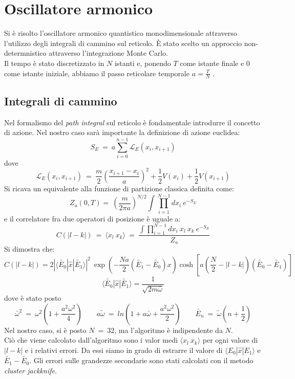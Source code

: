 \chapter{Oscillatore armonico}
Si è risolto l'oscillatore armonico quantistico monodimensionale attraverso l'utilizzo degli integrali di cammino sul reticolo.
È stato scelto un approccio non-determnistico attraverso l'integrazione Monte Carlo.\\
Il tempo è stato discretizzato in $N$ istanti e, ponendo $T$ come istante finale e $0$ come istante iniziale,
abbiamo il passo reticolare temporale $ a = \frac{T}{N}$ .
\section{Integrali di cammino}
Nel formalismo del \emph{path integral} sul reticolo è fondamentale introdurre il concetto di azione.
Nel nostro caso sarà importante la definizione di azione euclidea:
$$
 S_E  \ = \ a \sum_{i=0}^{n-1} \mathcal{L}_E(x_i,x_{i+1})
$$
dove
$$
\mathcal{L}_E(x_i,x_{i+1}) \ = \ \frac{m}{2} \left( \frac{x_{i+1} -x_{i}}{a} \right)^2 + \frac{1}{2}V(x_i)  +\frac{1}{2}V(x_{i+1})
$$
 Si ricava un equivalente alla funzione di partizione classica definita come: 
$$
 Z_a (0,T) =  \ \left( \frac{m}{2 \pi a}\right)^{N/2} \int \prod_{i=1}^{N-1} dx_i \ e^{-S_E}
$$
e il correlatore fra due operatori di posizione è uguale a:
$$
 C( | l -k|) \ = \ \langle x_l \ x_k \rangle  \ = \  \frac{ \int \prod_{i=1}^{N-1} dx_i \ x_l \ x_k \ e^{-S_E}}{Z_a}
$$
Si dimostra che:
$$
 C( | l -k|)= 2 | \langle \tilde{E_0} | \hat{x} | \tilde{E_1} \rangle  |^2 \ \exp{\left( - \frac{N a}{2} \left( \tilde{E_1}-\tilde{E_0} \right) x \right)} \cosh \left[ a \left( \frac{N}{2} - | l - k | \right) (\tilde{E_0} -\tilde{E_1}) \right]  
$$
$$ 
\langle \tilde{E_0} | \hat{x} | \tilde{E_1} \rangle  = \frac{1}{\sqrt{2  m \bar{\omega}}}
$$
dove è stato posto
$$
 \bar{\omega}^2  \ = \  \omega^2 \left(1 + \frac{a^2 \omega^2}{4} \right) \qquad a \tilde{\omega} \ = \ ln \left( 1 + a \bar{\omega} + \frac{a^2 \omega^2}{2} \right) \qquad \tilde{E_n} \ = \  \tilde{\omega}\left( n + \frac{1}{2} \right) 
$$
Nel nostro caso, si è posto $ N \ = \ 32 $, ma l'algoritmo è indipendente da $N$.\\
Ciò che viene calcolato dall'algoritmo sono i valor medi $\langle x_l \ x_k \rangle $ per ogni valore di $ | l - k| $ e i relativi errori.
Da essi siamo in grado di estrarre il valore di $ \langle E_0 | \hat{x} | E_1 \rangle $ e $ \tilde{E_1}-\tilde{E_0} $.
Gli errori sulle grandezze secondarie sono stati calcolati con il metodo \emph{cluster jackknife}.
